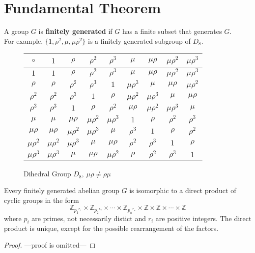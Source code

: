 \section{Fundamental Theorem}
\begin{definition}
	A group $G$ is \textbf{finitely generated} if $G$ has a finite subset that generates $G$.\\
	For example, $\{ 1,\rho^2,\mu,\mu\rho^2 \}$ is a finitely generated subgroup of $D_8$.
\end{definition}

\begin{figure}[h]
	\centering
	\begin{tabular}{c|cccccccc}
		$\circ$ & $1$ & $\rho$ & $\rho^2$ & $\rho^3$ & $\mu$ & $\mu\rho$ & $\mu\rho^2$ & $\mu\rho^3$ \\ \hline
		$1$ & $1$ & $\rho$ & $\rho^2$ & $\rho^3$ & $\mu$ & $\mu\rho$ & $\mu\rho^2$ & $\mu\rho^3$ \\ 
		$\rho$ & $\rho$ & $\rho^2$ & $\rho^3$ & $1$ & $\mu\rho^3$ & $\mu$ & $\mu\rho$ & $\mu\rho^2$ \\
		$\rho^2$ & $\rho^2$ & $\rho^3$ & $1$ & $\rho$ & $\mu\rho^2$ & $\mu\rho^3$ & $\mu$ & $\mu\rho$ \\
		$\rho^3$ & $\rho^3$ & $1$ & $\rho$ & $\rho^2$ & $\mu\rho$ & $\mu\rho^2$ & $\mu\rho^3$ & $\mu$ \\
		$\mu$ & $\mu$ & $\mu\rho$ & $\mu\rho^2$ & $\mu\rho^3$ & $1$ & $\rho$ & $\rho^2$ & $\rho^3$ \\
		$\mu\rho$ & $\mu\rho$ & $\mu\rho^2$ & $\mu\rho^3$ & $\mu$ & $\rho^3$ & $1$ & $\rho$ & $\rho^2$ \\
		$\mu\rho^2$ & $\mu\rho^2$ & $\mu\rho^3$ & $\mu$ & $\mu\rho$ & $\rho^2$ & $\rho^3$ & $1$ & $\rho$ \\
		$\mu\rho^3$ & $\mu\rho^3$ & $\mu$ & $\mu\rho$ & $\mu\rho^2$ & $\rho$ & $\rho^2$ & $\rho^3$ & $1$
	\end{tabular}
	\caption{Dihedral Group $D_8,\ \mu\rho \ne \rho\mu$}
\end{figure}

\begin{theorem}
	Every finitely generated abelian group $G$ is isomorphic to a direct product of cyclic groups in the form
	$$\mathbb{Z}_{{p_1}^{r_1}} \times\mathbb{Z}_{{p_2}^{r_2}} \times \cdots \times \mathbb{Z}_{{p_n}^{r_n}} \times \mathbb{Z} \times \mathbb{Z} \times \cdots \times \mathbb{Z}$$
	where $p_i$ are primes, not necessarily distict and $r_i$ are positive integers. The direct product is unique, except for the possible rearrangement of the factors.
\end{theorem}
\begin{proof}
	---proof is omitted---
\end{proof}

